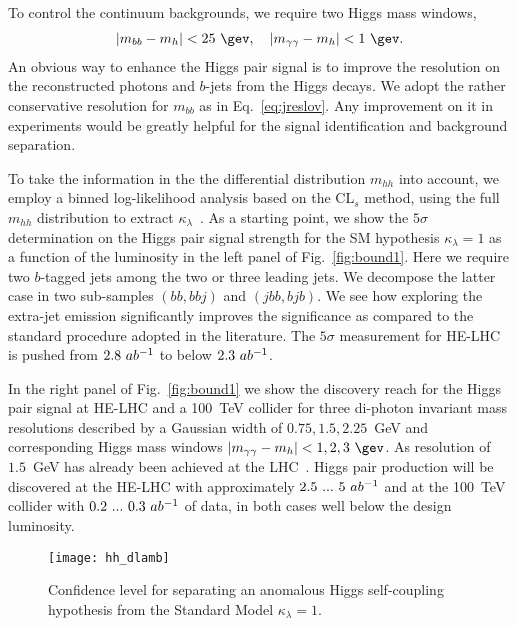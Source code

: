 To control the continuum backgrounds, we require two Higgs mass windows,
%
\begin{align}
 |m_{bb}-m_h|<25~\gev, \quad 
 |m_{\gamma\gamma}-m_h|<1~\gev  .
 \label{eq:jreslov}
\end{align}
%
An obvious way to enhance the Higgs pair signal is to improve the
resolution on the reconstructed photons and $b$-jets from the Higgs
decays.  We adopt the rather conservative resolution for $m_{bb}$ as
in Eq.~\eqref{eq:jreslov}. Any improvement on it in experiments would
be greatly helpful for the signal identification and background
separation.  
\medskip

To take the information in the the differential distribution
$m_{hh}$ into account, we employ a binned log-likelihood analysis based on the 
CL$_{s}$ method, using the full $m_{hh}$ distribution to extract 
$\kappa_{\lambda}$~\cite{Read:2002hq}. As a starting point, we show the $5\sigma$ 
determination on the Higgs pair signal strength for the SM hypothesis $\kappa_{\lambda}=1$ as a 
function of the luminosity in the left panel of Fig.~\ref{fig:bound1}. Here 
we require two $b$-tagged jets among the two or three leading jets. We 
decompose the latter case in two  sub-samples $(bb,bbj)$ and $(jbb,bjb)$. 
We see how exploring the extra-jet emission significantly improves the 
significance as compared to the standard procedure adopted in the 
literature. The $5\sigma$ measurement for HE-LHC is pushed from 
$2.8~ab^{-1}$ to below $2.3~ab^{-1}$. 

In the right panel of Fig.~\ref{fig:bound1} we show the discovery reach for 
the Higgs pair signal at HE-LHC and a 100~TeV collider for three di-photon 
invariant mass resolutions described by a Gaussian width of 
$0.75,1.5,2.25$~GeV and corresponding Higgs mass windows 
$|m_{\gamma\gamma}-m_h|<1,2,3~\gev$. As resolution of $1.5$~GeV 
has already been achieved at the LHC~\cite{CMS:2016zjv}. Higgs pair 
production will be discovered at the HE-LHC with approximately 
$2.5~...~5~ab^{-1}$ and at the 100~TeV collider with $0.2~...~0.3~ab^{-1}$ 
of data, in both cases well below the design luminosity.

\begin{figure}[t!]
\centering 
  \texttt{[image: hh\_dlamb]}
  \caption{Confidence level for separating an anomalous Higgs
    self-coupling hypothesis from the Standard Model
    $\kappa_{\lambda}=1$.}
 \label{fig:bound2}
\end{figure}

